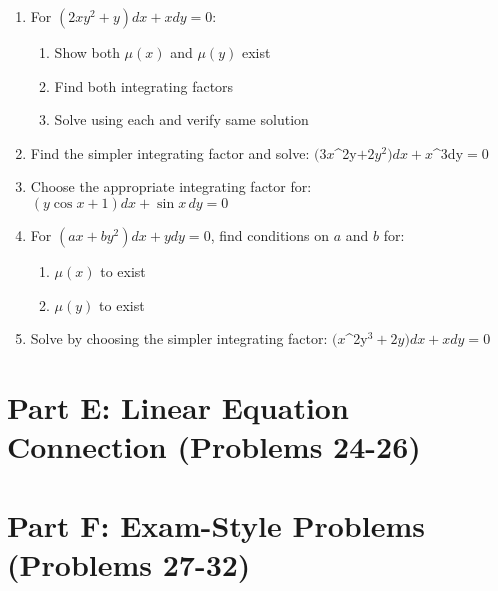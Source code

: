 \documentclass[12pt]{article}
\begin{document}
\begin{enumerate}[start=19]
\item For $(2xy^{2} + y)dx + xdy = 0$:
\begin{enumerate}[label=(\alph*)]
    \item Show both $\mu(x)$ and $\mu(y)$ exist
    \item Find both integrating factors
    \item Solve using each and verify same solution
\end{enumerate}

\item Find the simpler integrating factor and solve:
$(3x$^{2y}$ + 2y^{2})dx + x$^{3dy}$ = 0$

\item Choose the appropriate integrating factor for:
$(y\cos x + 1)dx + \sin x\,dy = 0$

\item For $(ax + by^{2})dx + ydy = 0$, find conditions on $a$ and $b$ for:
\begin{enumerate}[label=(\alph*)]
    \item $\mu(x)$ to exist
    \item $\mu(y)$ to exist
\end{enumerate}

\item Solve by choosing the simpler integrating factor:
$(x$^{2y}$^3 + 2y)dx + xdy = 0$
\end{enumerate}

\section*{Part E: Linear Equation Connection (Problems 24-26)}


\section*{Part F: Exam-Style Problems (Problems 27-32)}
\end{document}
